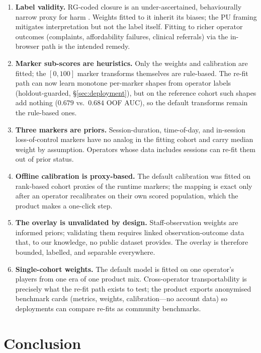 \documentclass[11pt]{article}
\begin{document}
\begin{enumerate}\itemsep2pt
  \item \textbf{Label validity.} RG-coded closure is an under-ascertained,
  behaviourally narrow proxy for harm \citep{catania2021}. Weights fitted to it
  inherit its biases; the PU framing mitigates interpretation but not the label itself.
  Fitting to richer operator outcomes (complaints, affordability failures, clinical
  referrals) via the in-browser path is the intended remedy.
  \item \textbf{Marker sub-scores are heuristics.} Only the weights and calibration are
  fitted; the $[0,100]$ marker transforms themselves are rule-based. The re-fit path
  can now learn monotone per-marker shapes from operator labels (holdout-guarded,
  \S\ref{sec:deployment}), but on the reference cohort such shapes add nothing
  ($0.679$ vs.\ $0.684$ OOF AUC), so the default transforms remain the rule-based ones.
  \item \textbf{Three markers are priors.} Session-duration, time-of-day, and
  in-session loss-of-control markers have no analog in the fitting cohort and carry
  median weight by assumption. Operators whose data includes sessions can re-fit them
  out of prior status.
  \item \textbf{Offline calibration is proxy-based.} The default calibration was
  fitted on rank-based cohort proxies of the runtime markers; the mapping is exact only
  after an operator recalibrates on their own scored population, which the product
  makes a one-click step.
  \item \textbf{The overlay is unvalidated by design.} Staff-observation weights are
  informed priors; validating them requires linked observation-outcome data that, to
  our knowledge, no public dataset provides. The overlay is therefore bounded, labelled,
  and separable everywhere.
  \item \textbf{Single-cohort weights.} The default model is fitted on one operator's
  players from one era of one product mix. Cross-operator transportability is precisely
  what the re-fit path exists to test; the product exports anonymised benchmark cards
  (metrics, weights, calibration---no account data) so deployments can compare re-fits
  as community benchmarks.
\end{enumerate}

\section{Conclusion}
\end{document}
